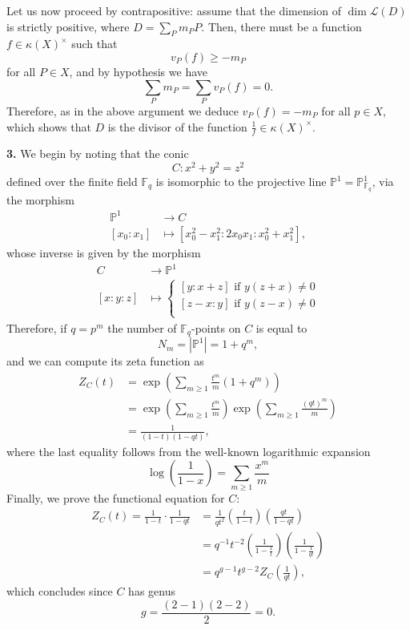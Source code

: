 \documentclass[a4paper]{article}
\renewcommand{\L}{\mathcal{L}}
\renewcommand{\k}{\kappa}
\theoremstyle{definition}
\theoremstyle{definition}
\theoremstyle{remark}
\theoremstyle{definition}
\begin{document}
Let us now proceed by contrapositive: assume that the dimension of $\dim{\L(D)}$ is strictly positive, where $D=\sum_P{m_P P}$. Then, there must be a function $f\in\k(X)^\times$ such that
\[
	v_P(f)\geq -m_P
\]
for all $P\in X$, and by hypothesis we have
\[
	\sum_P{m_P}=\sum_P{v_P(f)}=0.
\]
Therefore, as in the above argument we deduce $v_P(f)=-m_P$ for all $p\in X$, which shows that $D$ is the divisor of the function $\frac{1}{f}\in \k(X)^\times$.

\textbf{3.} We begin by noting that the conic
\[
	C: x^2+y^2=z^2
\]
defined over the finite field $\mathbb{F}_q$ is isomorphic to the projective line $\mathbb{P}^1=\mathbb{P}^1_{\mathbb{F}_q}$, via the morphism
\begin{align*}
	\mathbb{P}^1 & \longrightarrow C                              \\
	[x_0:x_1]    & \longmapsto [x_0^2-x_1^2:2x_0x_1:x_0^2+x_1^2],
\end{align*}
whose inverse is given by the morphism
\begin{align*}
	C       & \longrightarrow \mathbb{P}^1                \\
	[x:y:z] & \longmapsto \begin{cases}
		                      [y:x+z]\text{ if } y(z+x)\neq 0 \\
		                      [z-x:y]\text{ if } y(z-x)\neq 0 \\
	                      \end{cases}
\end{align*}
Therefore, if $q=p^m$ the number of $\mathbb{F}_q$-points on $C$ is equal to
\[
	N_m=\left|\mathbb{P}^1\right|=1+q^m
	,\]
and we can compute its zeta function as
\begin{align*}
	Z_C(t) & =\exp{\left(\sum_{m\geq 1}\frac{t^m}{m}(1+q^m)\right)}                                           \\
	       & =\exp{\left(\sum_{m\geq 1}\frac{t^m}{m}\right)}\exp{\left(\sum_{m\geq 1}\frac{(qt)^m}{m}\right)} \\
	       & = \frac{1}{(1-t)(1-qt)},
\end{align*}
where the last equality follows from the well-known logarithmic expansion
\[
	\log\left(\frac{1}{1-x}\right)=\sum_{m\geq 1}\frac{x^m}{m}
\]
Finally, we prove the functional equation for $C$:
\begin{align*}
	Z_C(t)=\frac{1}{1-t}\cdot \frac{1}{1-qt} & =\frac{1}{qt^2}\left(\frac{t}{1-t}\right)\left(\frac{qt}{1-qt}\right)                  \\
	                                         & =q^{-1}t^{-2}\left(\frac{1}{1-\frac{1}{t}}\right)\left(\frac{1}{1-\frac{1}{qt}}\right) \\
	                                         & = q^{g-1}t^{g-2}Z_C\left(\frac{1}{qt}\right),
\end{align*}
which concludes since $C$ has genus
\[
	g= \frac{(2-1)(2-2)}{2}=0.
\]
\end{document}
